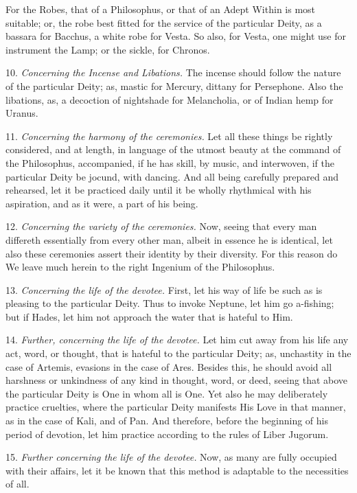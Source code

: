For the Robes, that of a Philosophus, or that of an Adept Within is most suitable; or, the robe best fitted for the service of the particular Deity, as a bassara for Bacchus, a white robe for Vesta. So also, for Vesta, one might use for instrument the Lamp; or the sickle, for Chronos.

10. \textit{Concerning the Incense and Libations.} The incense should follow the nature of the particular Deity; as, mastic for Mercury, dittany for Persephone. Also the libations, as, a decoction of nightshade for Melancholia, or of Indian hemp for Uranus.

11. \textit{Concerning the harmony of the ceremonies.} Let all these things be rightly considered, and at length, in language of the utmost beauty at the command of the Philosophus, accompanied, if he has skill, by music, and interwoven, if the particular Deity be jocund, with dancing. And all being carefully prepared and rehearsed, let it be practiced daily until it be wholly rhythmical with his aspiration, and as it were, a part of his being.

12. \textit{Concerning the variety of the ceremonies.} Now, seeing that every man differeth essentially from every other man, albeit in essence he is identical, let also these ceremonies assert their identity by their diversity. For this reason do We leave much herein to the right Ingenium of the Philosophus.

13. \textit{Concerning the life of the devotee.} First, let his way of life be such as is pleasing to the particular Deity. Thus to invoke Neptune, let him go a-fishing; but if Hades, let him not approach the water that is hateful to Him.

14. \textit{Further, concerning the life of the devotee.} Let him cut away from his life any act, word, or thought, that is hateful to the particular Deity; as, unchastity in the case of Artemis, evasions in the case of Ares. Besides this, he should avoid all harshness or unkindness of any kind in thought, word, or deed, seeing that above the particular Deity is One in whom all is One. Yet also he may deliberately practice cruelties, where the particular Deity manifests His Love in that manner, as in the case of Kali, and of Pan. And therefore, before the beginning of his period of devotion, let him practice according to the rules of Liber Jugorum.

15. \textit{Further concerning the life of the devotee.} Now, as many are fully occupied with their affairs, let it be known that this method is adaptable to the necessities of all.

